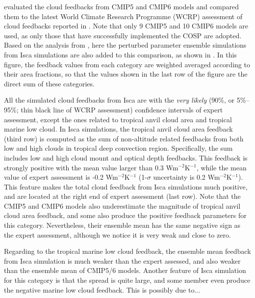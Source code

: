 \cite{Zelinka2021evaluating} evaluated the cloud feedbacks from CMIP5 and CMIP6 models and compared them to the latest World Climate Research Programme (WCRP) assessment of cloud feedbacks reported in \cite{Sherwood2020}. Note that only 9 CMIP5 and 10 CMIP6 models are used, as only those that have successfully implemented the COSP \citep{BodasSalcedo2011} are adopted. Based on the analysis from \cite{Zelinka2021evaluating}, here the perturbed parameter ensemble simulations from Isca simulations are also added to this comparison, as shown in . In this figure, the feedback values from each category are weighted averaged according to their area fractions, so that the values shown in the last row of the figure are the direct sum of these categories. 

All the simulated cloud feedbacks from Isca are with the \textit{very likely} (90\%, or 5\%--95\%; thin black line of WCRP assessment) confidence intervals of expert assessment, except the ones related to tropical anvil cloud area and tropical marine low cloud. In Isca simulations, the tropical anvil cloud area feedback (third row) is computed as the sum of non-altitude related feedbacks from both low and high clouds in tropical deep convection region. Specifically, the sum includes low and high cloud mount and optical depth feedbacks. This feedback is strongly positive with the mean value larger than 0.3 Wm$^{-2}$K$^{-1}$, while the mean value of expert assessment is -0.2 Wm$^{-2}$K$^{-1}$ (1-$\sigma$ uncertainty is 0.2 Wm$^{-2}$K$^{-1}$). This feature makes the total cloud feedback from Isca simulations much positive, and are located at the right end of expert assessment (last row). Note that the CMIP5 and CMIP6 models also underestimate the magnitude of tropical anvil cloud area feedback, and some also produce the positive feedback parameters for this category. Nevertheless, their ensemble mean has the same negative sign as the expert assessment, although we notice it is very weak and close to zero. 

Regarding to the tropical marine low cloud feedback, the ensemble mean feedback from Isca simulation is much weaker than the expert assessed, and also weaker than the ensemble mean of CMIP5/6 models. Another feature of Isca simulation for this category is that the spread is quite large, and some member even produce the negative marine low cloud feedback. This is possibly due to...


